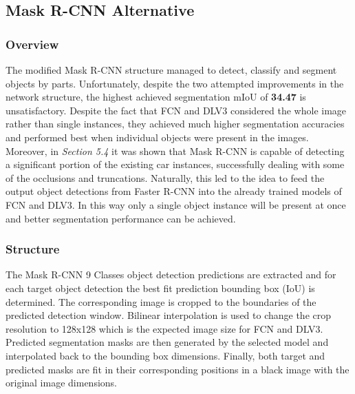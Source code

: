 \documentclass[main.tex]{subfiles}
\begin{document}
\subsection{Mask R-CNN Alternative}
\subsubsection{Overview}
The modified Mask R-CNN structure managed to detect, classify and segment objects by parts. Unfortunately, despite the two attempted improvements in the network structure, the highest achieved segmentation mIoU of \textbf{34.47} is unsatisfactory. Despite the fact that FCN and DLV3 considered the whole image rather than single instances, they achieved much higher segmentation accuracies and performed best when individual objects were present in the images. Moreover, in \emph{Section 5.4} it was shown that Mask R-CNN is capable of detecting a significant portion of the existing car instances, successfully dealing with some of the occlusions and truncations. Naturally, this led to the idea to feed the output object detections from Faster R-CNN into the already trained models of FCN and DLV3. In this way only a single object instance will be present at once and better segmentation performance can be achieved. 
\subsubsection{Structure}
\indent The Mask R-CNN 9 Classes object detection predictions are extracted and for each target object detection the best fit prediction bounding box (IoU) is determined. The corresponding image is cropped to the boundaries of the predicted detection window. Bilinear interpolation is used to change the crop resolution to 128x128 which is the expected image size for FCN and DLV3. Predicted segmentation masks are then generated by the selected model and interpolated back to the bounding box dimensions. Finally, both target and predicted masks are fit in their corresponding positions in a black image with the original image dimensions. 
\end{document}
